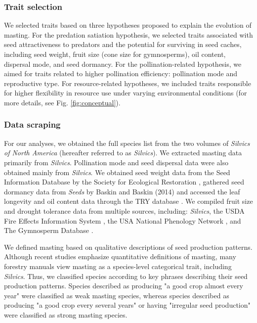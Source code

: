 \documentclass{article}
\begin{document}
\subsubsection{Trait selection}
We selected traits based on three hypotheses proposed to explain the evolution of masting. For the predation satiation hypothesis, we selected traits associated with seed attractiveness to predators and the potential for surviving in seed caches, including seed weight, fruit size (cone size for gymnosperms), oil content, dispersal mode, and seed dormancy. For the pollination-related hypothesis, we aimed for traits related to higher pollination efficiency: pollination mode and reproductive type. For resource-related hypotheses, we included traits responsible for higher flexibility in resource use under varying environmental conditions (for more details, see Fig. \ref{fig:conceptual}).
\subsubsection{Data scraping}
For our analyses, we obtained the full species list from the two volumes of \textit{Silvics of North America} \citep{burns1990silvics,burns1990silvics2} (hereafter referred to  as \textit{Silvics}). We extracted masting data primarily from \textit{Silvics}. Pollination mode and seed dispersal data were also obtained mainly from \textit{Silvics}. We obtained seed weight data from the Seed Information Database by the Society for Ecological Restoration \citep{ser2023sid}, gathered seed dormancy data from \textit{Seeds} by Baskin and Baskin (2014) and accessed the leaf longevity and oil content data through the TRY database \citep{kattge2020try}. We compiled fruit size and drought tolerance data from multiple sources, including: \textit{Silvics}, the USDA Fire Effects Information System \citep{usfsfeis}, the USA National Phenology Network \citep{usanpn}, and The Gymnosperm Database \citep{gymnosperm}.

We defined masting based on qualitative descriptions of seed production patterns. Although recent studies emphasize quantitative definitions of masting, many forestry manuals view masting as a species-level categorical trait, including \textit{Silvics}. Thus, we classified species according to key phrases describing their seed production patterns. Species described as producing "a good crop almost every year" were classified as weak masting species, whereas species described as producing "a good crop every several years" or having "irregular seed production" were classified as strong masting species.
\end{document}
